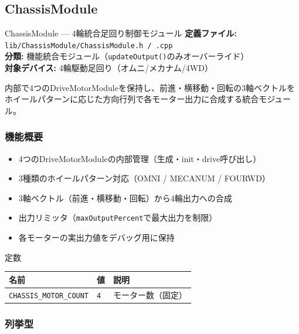 \subsection{ChassisModule}

\begin{apibox}{ChassisModule --- 4輪統合足回り制御モジュール}
\textbf{定義ファイル:} \texttt{lib/ChassisModule/ChassisModule.h / .cpp}\\
\textbf{分類:} 機能統合モジュール（\texttt{updateOutput()}のみオーバーライド）\\
\textbf{対象デバイス:} 4輪駆動足回り（オムニ/メカナム/4WD）

内部で4つのDriveMotorModuleを保持し、前進・横移動・回転の3軸ベクトルを
ホイールパターンに応じた方向行列で各モーター出力に合成する統合モジュール。
\end{apibox}

\subsubsection{機能概要}

\begin{itemize}
    \item 4つのDriveMotorModuleの内部管理（生成・init・drive呼び出し）
    \item 3種類のホイールパターン対応（OMNI / MECANUM / FOURWD）
    \item 3軸ベクトル（前進・横移動・回転）から4輪出力への合成
    \item 出力リミッタ（\texttt{maxOutputPercent}で最大出力を制限）
    \item 各モーターの実出力値をデバッグ用に保持
\end{itemize}

\begin{funcblock}{定数}
\begin{tabularx}{\textwidth}{l l X}
\toprule
\textbf{名前} & \textbf{値} & \textbf{説明} \\
\midrule
\texttt{CHASSIS\_MOTOR\_COUNT} & \texttt{4} & モーター数（固定） \\
\bottomrule
\end{tabularx}
\end{funcblock}

\subsubsection{列挙型}

